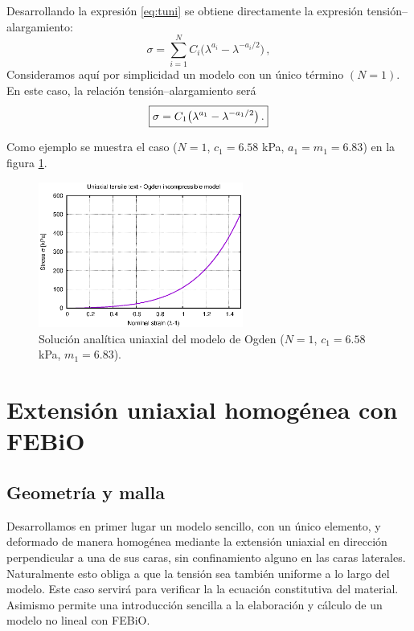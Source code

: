 Desarrollando la expresión \eqref{eq:tuni} se obtiene directamente la expresión tensión--alargamiento:
\begin{equation}
  \sigma = \sum_{i=1}^{N} C_{i}\big( \lambda^{a_{i}}-\lambda^{-a_{i}/2}\big)
  \,,
  \label{eq:ogdenh-tuniax}
\end{equation}
Consideramos aquí por simplicidad un modelo con un único término $(N=1)$.
En este caso, la relación tensión--alargamiento será
\begin{equation}
	\fbox{$\displaystyle 
  \sigma = C_{1}\big( \lambda^{a_{1}}-\lambda^{-a_{1}/2}\big)
  \,.
  $}
  \label{eq:ogdenh-tuniax1}
\end{equation}

Como ejemplo se muestra el caso ($N=1$, $c_{1}=6.58$ kPa, $a_{1}=m_{1}=6.83$) en la figura \ref{fig:ogden-anal}.
\begin{figure}[!htp]
\centering
\includegraphics[width=0.6\textwidth]{figuras_3/ogden-anal.eps}
\caption{Solución analítica uniaxial del modelo de Ogden ($N=1$, $c_{1}=6.58$ kPa, $m_{1}=6.83$).}
\label{fig:ogden-anal}
\end{figure}


\section{Extensión uniaxial homogénea con FEBiO}
\label{sec:homog}

\subsection{Geometría y malla}
\label{sec_modelo-h}

Desarrollamos en primer lugar un modelo sencillo, con un único elemento, y deformado de manera homogénea mediante la extensión uniaxial en dirección perpendicular a una de sus caras, sin confinamiento alguno en las caras laterales.
Naturalmente esto obliga a que la tensión sea también uniforme a lo largo del modelo.
Este caso servirá para verificar la la ecuación constitutiva del material.
Asimismo permite una introducción sencilla a la elaboración y cálculo de un modelo no lineal con FEBiO.

